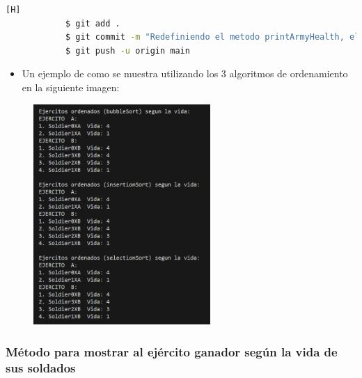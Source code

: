 \documentclass{article}
\begin{document}
        

        \begin{lstlisting}[language=bash,caption={Commit \href{https://github.com/hernanchoquehuanca/fp2-23b/commit/fdb8f2cc3b507c74a19f0d255425c3a92b8a8206}{fdb8f2c}: Se implementaró el método printArmyHealth}][H]
    		$ git add .
    		$ git commit -m "Redefiniendo el metodo printArmyHealth, el cual nos muestra los ArrayList de ejercitos ya ordenados segun el nivel de vida (mayor a menor)"	
    		$ git push -u origin main
    	\end{lstlisting}
        \newpage
        \begin{itemize}
            \begin{itemize}
                \item Un ejemplo de como se muestra utilizando los 3 algoritmos de ordenamiento en la siguiente imagen:
            \end{itemize}
        \end{itemize}

        \begin{figure}[H]
            \centering
            \includegraphics[width=0.6\textwidth,keepaspectratio]{img/printArmyHealth.png}
            \caption{}
        \end{figure}
        
        
        \subsubsection{Método para mostrar al ejército ganador según la vida de sus soldados}
        
\end{document}
